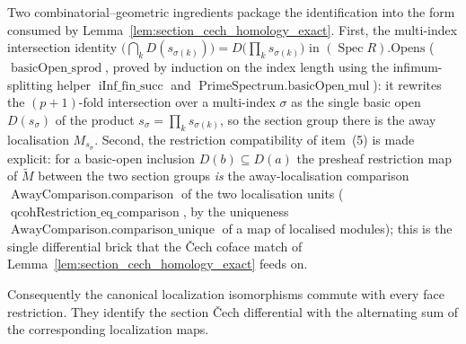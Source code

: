 \begin{definition}
  Two combinatorial--geometric ingredients package the identification into the form
  consumed by Lemma~\ref{lem:section_cech_homology_exact}. First, the multi-index
  intersection identity
  \(\bigl(\bigcap_k D(s_{\sigma(k)})\bigr) = D\bigl(\prod_k s_{\sigma(k)}\bigr)\) in
  \((\operatorname{Spec} R).\mathrm{Opens}\) (\(\operatorname{basicOpen\_sprod}\), proved
  by induction on the index length using the infimum-splitting helper
  \(\operatorname{iInf\_fin\_succ}\) and \(\operatorname{PrimeSpectrum.basicOpen\_mul}\)):
  it rewrites the \((p+1)\)-fold intersection over a multi-index \(\sigma\) as the single
  basic open \(D(s_\sigma)\) of the product \(s_\sigma = \prod_k s_{\sigma(k)}\), so the
  section group there is the away localisation \(M_{s_\sigma}\). Second, the restriction
  compatibility of item~(5) is made explicit: for a basic-open inclusion
  \(D(b) \subseteq D(a)\) the presheaf restriction map of \(\widetilde{M}\) between the
  two section groups \emph{is} the away-localisation comparison
  \(\operatorname{AwayComparison.comparison}\) of the two localisation units
  (\(\operatorname{qcohRestriction\_eq\_comparison}\), by the uniqueness
  \(\operatorname{AwayComparison.comparison\_unique}\) of a map of localised modules);
  this is the single differential brick that the {\v C}ech coface match of
  Lemma~\ref{lem:section_cech_homology_exact} feeds on.

  Consequently the canonical localization isomorphisms commute with every face
  restriction. They identify the section {\v C}ech differential with the alternating
  sum of the corresponding localization maps.
\end{definition}

